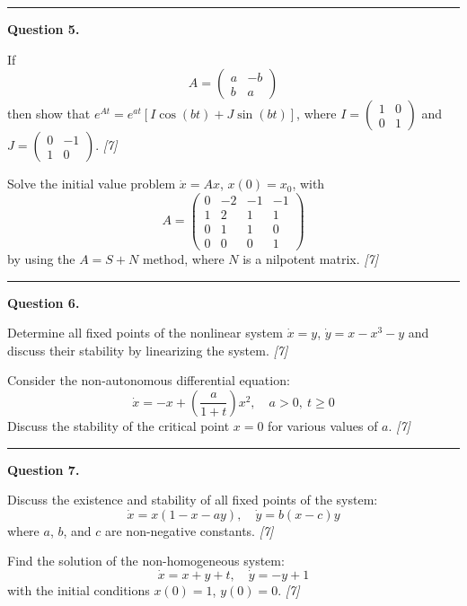 \documentclass[11pt,a4paper]{article}
\newcommand{\pts}[1]{\hfill   \textit{[#1]}}
\begin{document}
\medskip\rule{\linewidth}{0.2pt}

\medskip


\noindent   \textbf{Question 5.}

\begin{parts}
  \item If
  \[
  A = 
\begin{pmatrix} a & -b \\ b & a \end{pmatrix}
  \]
  then show that $e^{At} = e^{at} \left[ I \cos(bt) + J \sin(bt) \right]$, where $I = 
\begin{pmatrix} 1 & 0 \\ 0 & 1 \end{pmatrix}$ and $J = 
\begin{pmatrix} 0 & -1 \\ 1 & 0 \end{pmatrix}$. \pts{7}
  \item Solve the initial value problem $\dot{x} = Ax$, $x(0) = x_0$, with
  \[
  A = 
\begin{pmatrix} 0 & -2 & -1 & -1 \\ 1 & 2 & 1 & 1 \\ 0 & 1 & 1 & 0 \\ 0 & 0 & 0 & 1 \end{pmatrix}
  \]
  by using the $A = S + N$ method, where $N$ is a nilpotent matrix. \pts{7}
\end{parts}

\medskip\rule{\linewidth}{0.2pt}

\medskip


\noindent   \textbf{Question 6.}

\begin{parts}
  \item Determine all fixed points of the nonlinear system $\dot{x} = y$, $\dot{y} = x - x^3 - y$ and discuss their stability by linearizing the system. \pts{7}
  \item Consider the non-autonomous differential equation:
  \[
  \dot{x} = -x + \left( \frac{a}{1+t} \right) x^2, \quad a > 0, \ t \ge 0
  \]
  Discuss the stability of the critical point $x = 0$ for various values of $a$. \pts{7}
\end{parts}

\medskip\rule{\linewidth}{0.2pt}

\medskip


\noindent   \textbf{Question 7.}

\begin{parts}
  \item Discuss the existence and stability of all fixed points of the system:
  \[
  \dot{x} = x(1-x-ay), \quad \dot{y} = b(x-c)y
  \]
  where $a$, $b$, and $c$ are non-negative constants. \pts{7}
  \item Find the solution of the non-homogeneous system:
  \[
  \dot{x} = x + y + t, \quad \dot{y} = -y + 1
  \]
  with the initial conditions $x(0) = 1$, $y(0) = 0$. \pts{7}
\end{parts}
\end{document}
